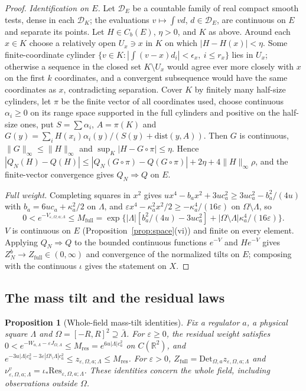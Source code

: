 \documentclass[11pt]{article}
\theoremstyle{plain}
\newtheorem{proposition}[theorem]{Proposition}
\theoremstyle{definition}
\theoremstyle{remark}
\newcommand{\R}{\mathbb{R}}
\newcommand{\cD}{\mathcal{D}}
\newcommand{\Res}{\mathrm{Res}}
\newcommand{\Det}{\mathrm{Det}}
\newcommand{\dist}{\mathrm{dist}}
\begin{document}
\begin{proof}
\emph{Identification on $E$.} Let $\cD_E$ be a countable family of real compact
smooth tests, dense in each $\cD_K$; the evaluations $v\mapsto\int vd$, $d\in\cD_E$, are
continuous on $E$ and separate its points. Let $H\in C_b(E)$, $\eta>0$, and $K$ as
above. Around each $x\in K$ choose a relatively open $U_x\ni x$ in $K$ on which
$|H-H(x)|<\eta$. Some finite-coordinate cylinder
$\{v\in K:|\int(v-x)d_i|<\epsilon_x,\ i\le r_x\}$ lies in $U_x$; otherwise a sequence in the
closed set $K\setminus U_x$ would agree ever more closely with $x$ on the first $k$
coordinates, and a convergent subsequence would have the same coordinates as
$x$, contradicting separation. Cover $K$ by finitely many half-size cylinders,
let $\pi$ be the finite vector of all coordinates used, choose continuous
$\alpha_i\ge0$ on its range space supported in the full cylinders and positive on
the half-size ones, put $S=\sum\alpha_i$, $A=\pi(K)$ and
$G(y)=\sum_iH(x_i)\alpha_i(y)/(S(y)+\dist(y,A))$. Then $G$ is continuous,
$\|G\|_\infty\le\|H\|_\infty$ and $\sup_K|H-G\circ\pi|\le\eta$. Hence
$|Q_N(H)-Q(H)|\le|Q_N(G\circ\pi)-Q(G\circ\pi)|+2\eta+4\|H\|_\infty\rho$, and the finite-vector
convergence gives $Q_N\Rightarrow Q$ on $E$.

\emph{Full weight.} Completing squares in $x^{2}$ gives
$ux^{4}-b_ax^{2}+3uc_a^{2}\ge3uc_a^{2}-b_a^{2}/(4u)$ with $b_a=6uc_a+\kappa_a^{2}/2$ on $\Lambda$, and
$\varepsilon x^{4}-\kappa_a^{2}x^{2}/2\ge-\kappa_a^{4}/(16\varepsilon)$ on $\Omega\setminus\Lambda$, so
\begin{equation}\label{eq:Mfull}
0<e^{-V_{\varepsilon,\Omega,a;\Lambda}}\le M_{\mathrm{full}}
=\exp\bigl\{|\Lambda|[b_a^{2}/(4u)-3uc_a^{2}]+|\Omega\setminus\Lambda|\kappa_a^{4}/(16\varepsilon)\bigr\}.
\end{equation}
$V$ is continuous on $E$ (Proposition~\ref{prop:space}(vi)) and finite on every
element. Applying $Q_N\Rightarrow Q$ to the bounded continuous functions $e^{-V}$ and
$He^{-V}$ gives $Z^{b}_{N}\to Z_{\mathrm{full}}\in(0,\infty)$ and convergence of the normalized
tilts on $E$; composing with the continuous $\iota$ gives the statement on $X$.
\end{proof}

\subsection{The mass tilt and the residual laws}

\begin{proposition}[Whole-field mass-tilt identities]\label{prop:masstilt}
Fix a regulator $a$, a physical square $\Lambda$ and $\Omega=[-R,R]^{2}\supseteq\bar\Lambda$. For
$\varepsilon\ge0$, the residual weight satisfies
$0<e^{-W_{a,\Lambda}-\varepsilon J_{\Omega,\Lambda}}\le M_{\mathrm{res}}=e^{6u|\Lambda|c_a^{2}}$ on
$C(\R^{2})$, and
$e^{-3u|\Lambda|c_a^{2}-3\varepsilon|\Omega\setminus\Lambda|c_a^{2}}\le z_{\varepsilon,\Omega,a;\Lambda}\le M_{\mathrm{res}}$.
For $\varepsilon>0$, $Z_{\mathrm{full}}=\Det_{\Omega,a}z_{\varepsilon,\Omega,a;\Lambda}$ and
$\nu^{v}_{\varepsilon,\Omega,a;\Lambda}=\iota_*\Res_{\varepsilon,\Omega,a;\Lambda}$. These identities
concern the whole field, including observations outside $\Omega$.
\end{proposition}
\end{document}

